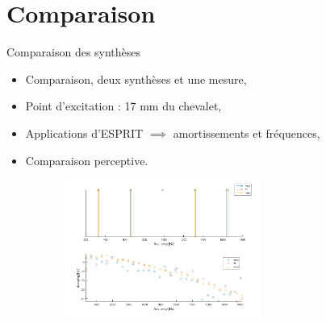 \section{Comparaison}

\begin{frame}{Comparaison des synthèses}
 \begin{itemize}
  \item Comparaison, deux synthèses et une mesure,
  \item Point d'excitation : 17 mm du chevalet,
  \item Applications d'ESPRIT \( \implies \) amortissements et fréquences,
  \item Comparaison perceptive.
 \end{itemize}
 
 \begin{figure}
  \centering
  \includegraphics[width=8cm,height=4.5cm]{figures/apotheose}
 \end{figure}
\end{frame}
